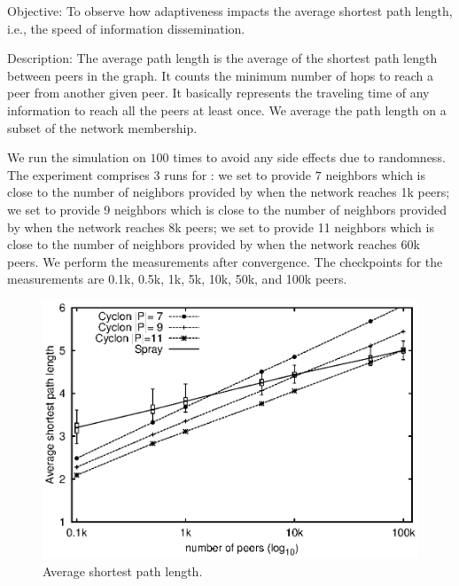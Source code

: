 \begin{asparadesc}
\item[Objective:] To observe how adaptiveness impacts the average shortest path
  length, i.e., the speed of information dissemination.
\item[Description:] The average path length is the average of the shortest path
  length between peers in the graph. It counts the minimum number of hops to
  reach a peer from another given peer. It basically represents the traveling
  time of any information to reach all the peers at least once. We average the
  path length on a subset of the network membership.

  We run the simulation on \SPRAY $100$ times to avoid any side effects due to
  randomness. The experiment comprises 3 runs for \CYCLON: we set \CYCLON to
  provide $7$ neighbors which is close to the number of neighbors provided by
  \SPRAY when the network reaches 1k peers; we set \CYCLON to provide 9
  neighbors which is close to the number of neighbors provided by \SPRAY when
  the network reaches 8k peers; we set \CYCLON to provide 11 neighbors which is
  close to the number of neighbors provided by \SPRAY when the network reaches
  60k peers. We perform the measurements after convergence. The checkpoints for
  the measurements are 0.1k, 0.5k, 1k, 5k, 10k, 50k, and 100k peers.

\begin{figure}
  \centering
  \includegraphics[width=\SCALE\columnwidth]{img/avgpath.eps}
  \caption{\label{fig:avgpath}Average shortest path length.}
\end{figure}


\end{asparadesc}
